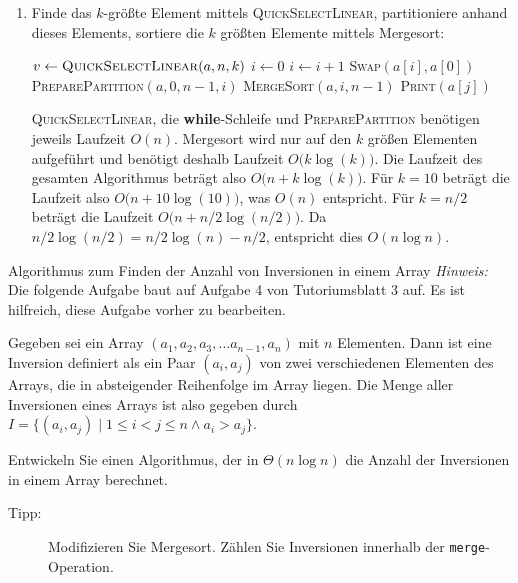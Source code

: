 \documentclass[11pt,a4paper]{article}
\begin{document}
\begin{loesung}
\begin{enumerate}
        \item Finde das $k$-größte Element mittels \textsc{QuickSelectLinear}, partitioniere anhand dieses Elements, sortiere die $k$ größten Elemente mittels Mergesort:
        \begin{algorithmic}[1]
                \State $v \gets \text{\textsc{QuickSelectLinear}$(a, n, k)$}$
                \State $i \gets 0$
                    \State $i \gets i + 1$
                \EndWhile
                \State \textsc{Swap}$(a[i], a[0])$
                \State \textsc{PreparePartition}$(a, 0, n - 1, i)$
                \State \textsc{MergeSort}$(a, i, n - 1)$
                    \State \textsc{Print}$(a[j])$
                \EndFor
            \EndProcedure
        \end{algorithmic}
        \textsc{QuickSelectLinear}, die \textbf{while}-Schleife und \textsc{PreparePartition} benötigen jeweils Laufzeit $O(n)$.
        Merge\-sort wird nur auf den $k$ größen Elementen aufgeführt und benötigt deshalb Laufzeit $O\big(k \log(k)\big)$. 
        Die Laufzeit des gesamten Algorithmus beträgt also $O\big(n + k\log(k)\big)$.
        Für $k = 10$ beträgt die Laufzeit also $O\big(n + 10\log(10)\big)$, was $O(n)$ entspricht.
        Für $k = n / 2$ beträgt die Laufzeit $O\big(n + n / 2 \log(n / 2))$.
        Da $n / 2 \log(n / 2) = n / 2 \log(n) - n / 2$, entspricht dies $O(n \log n)$.
    \end{enumerate}
\end{loesung}

\begin{aufgabe}{4}{Algorithmus zum Finden der Anzahl von Inversionen in einem Array}
    \textit{Hinweis:} Die folgende Aufgabe baut auf Aufgabe 4 von Tutoriumsblatt 3 auf.
    Es ist hilfreich, diese Aufgabe vorher zu bearbeiten.

    Gegeben sei ein Array $(a_1, a_2, a_3, \ldots a_{n - 1}, a_n)$ mit $n$ Elementen.
    Dann ist eine Inversion definiert als ein Paar $(a_i, a_j)$ von zwei verschiedenen Elementen des Arrays, die in absteigender Reihenfolge im Array liegen.
    Die Menge aller Inversionen eines Arrays ist also gegeben durch $I = \{(a_i, a_j) \mid 1 \leq i < j \leq n \wedge a_i > a_j \}$.

    Entwickeln Sie einen Algorithmus, der in $\Theta(n \log n)$ die Anzahl der Inversionen in einem Array berechnet.
    \begin{description}
        \item[Tipp:] Modifizieren Sie Mergesort. Zählen Sie Inversionen innerhalb der \texttt{merge}-Operation.
    \end{description}
\end{aufgabe}
\end{document}
